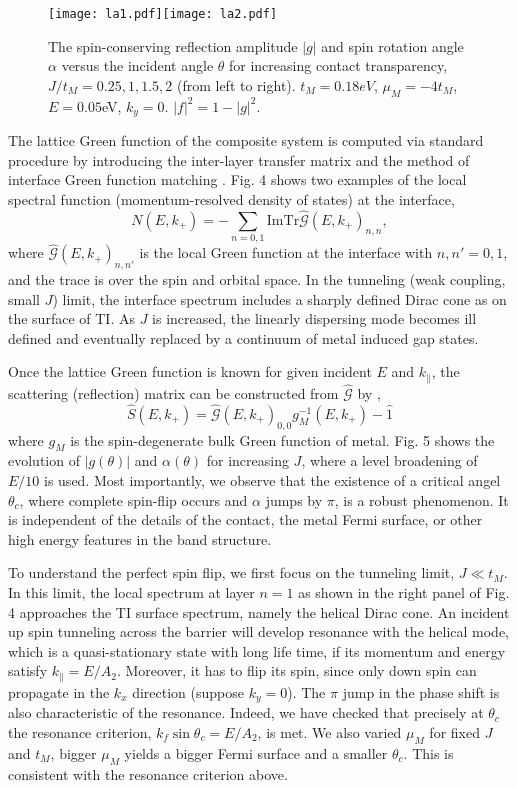 \documentclass[12pt,twocolumn]{article}
\newcommand{\kp}{k_{+}}
\begin{document}
\begin{figure}
\texttt{[image: la1.pdf]}\texttt{[image: la2.pdf]}
\caption{The spin-conserving reflection amplitude $|g|$ and spin rotation angle 
$\alpha$ versus the incident angle $\theta$ for increasing contact transparency,
$J/t_M=0.25, 1, 1.5, 2$ (from left to right). $t_M=0.18eV$, $\mu_M=-4t_M$, $E=0.05$eV, $k_y=0$.
$|f|^2=1-|g|^2$. 
}
\end{figure}

The lattice Green function of the composite system is computed via 
standard procedure by introducing the inter-layer transfer matrix 
and the method of interface Green function matching \cite{gf}. 
Fig. 4 shows two examples of the local spectral function 
(momentum-resolved density of states) at the interface,
\[ 
N(E,\kp)=-\sum_{n=0,1}\mathrm{Im Tr}\hat{\mathcal{G}}(E,\kp)_{n,n}, 
\]
where $\hat{\mathcal{G}}(E,\kp)_{n,n'}$ is 
the local Green function at the interface with $n,n'=0,1$, and  
the trace is over the spin and orbital space. 
In the tunneling (weak coupling, small $J$) limit, the interface spectrum includes 
a sharply defined Dirac cone as on the surface of TI. As $J$ is increased, 
the linearly dispersing mode becomes ill defined and eventually replaced 
by a continuum of metal induced gap states.

Once the lattice Green function is known for given incident $E$ and $k_{\parallel}$, 
the scattering (reflection) matrix can be constructed from $\hat{\mathcal{G}}$ by \cite{gf},
\[
\hat{S}(E,\kp)=\hat{\mathcal{G}}(E,\kp)_{0,0}g_M^{-1}(E,\kp)-\hat{1}
\]
where $g_M$ is the spin-degenerate bulk Green function of metal. Fig. 5 shows
the evolution of $|g(\theta)|$ and $\alpha(\theta)$ for increasing $J$, where 
a level broadening of $E/10$ is used. Most importantly,
we observe that the existence of a critical angel $\theta_c$, 
where complete spin-flip occurs and $\alpha$ jumps by $\pi$, is a robust phenomenon. 
It is independent of the details of the contact, the metal Fermi 
surface, or other high energy features in the band structure.

To understand the perfect spin flip, we first focus on 
the tunneling limit, $J\ll t_M$. In this limit, the local spectrum at layer $n=1$ as shown
in the right panel of Fig. 4 approaches
the TI surface spectrum, namely the helical Dirac cone. An incident up spin 
tunneling across the barrier will develop resonance with the helical mode, which is
a quasi-stationary state with long life time, if its 
momentum and energy satisfy $k_\parallel=E/A_2$. Moreover, it has to flip its spin, since 
only down spin can propagate in the $k_x$ direction (suppose $k_y=0$). 
The $\pi$ jump in the phase shift is also characteristic of the resonance. Indeed,
we have checked that precisely at $\theta_c$ the resonance criterion, $k_f\sin\theta_c=E/A_2$, 
is met.
We also varied $\mu_M$ for fixed $J$ and $t_M$, bigger $\mu_M$ 
yields a bigger Fermi surface and a smaller $\theta_c$. This is consistent with 
the resonance criterion above.
\end{document}
